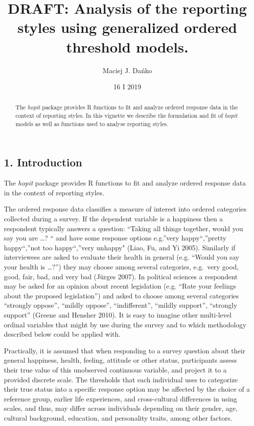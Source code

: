 \documentclass[]{article}
\title{DRAFT: Analysis of the reporting styles using generalized ordered
threshold models.}
\author{Maciej J. Dańko}
\date{16 I 2019}
\begin{document}
\maketitle
\begin{abstract}
The \emph{hopit} package provides R functions to fit and analyze ordered
response data in the context of reporting styles. In this vignette we
describe the formulation and fit of \emph{hopit} models as well as
functions used to analyse reporting styles.
\end{abstract}

\hypertarget{introduction}{%
\subsection{1. Introduction}\label{introduction}}

The \emph{hopit} package provides R functions to fit and analyze ordered
response data in the context of reporting styles.

The ordered response data classifies a measure of interest into ordered
categories collected during a survey. If the dependent variable is a
happiness then a respondent typically answers a question: ``Taking all
things together, would you say you are \ldots{}? `` and have some
response options e.g.''very happy``,''pretty happy``,''not too
happy``,''very unhappy" (Liao, Fu, and Yi 2005). Similarly if
interviewees are asked to evaluate their health in general (e.g. ``Would
you say your health is \ldots{}?'') they may choose among several
categories, e.g.~very good, good, fair, bad, and very bad (Jürges 2007).
In political sciences a respondent may be asked for an opinion about
recent legislation (e.g. ``Rate your feelings about the proposed
legislation'') and asked to choose among several categories ``strongly
oppose'', ``mildly oppose'', ``indifferent'', ``mildly support'',
``strongly support'' (Greene and Hensher 2010). It is easy to imagine
other multi-level ordinal variables that might by use during the survey
and to which methodology described below could be applied with.

Practically, it is assumed that when responding to a survey question
about their general happiness, health, feeling, attitude or other
status, participants assess their true value of this unobserved
continuous variable, and project it to a provided discrete scale. The
thresholds that each individual uses to categorize their true status
into a specific response option may be affected by the choice of a
reference group, earlier life experiences, and cross-cultural
differences in using scales, and thus, may differ across individuals
depending on their gender, age, cultural background, education, and
personality traits, among other factors.
\end{document}
